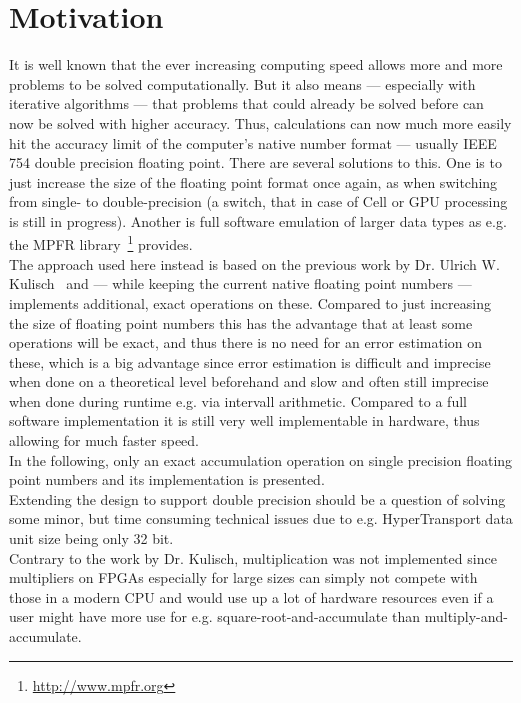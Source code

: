 
\chapter{Motivation}
It is well known that the ever increasing computing speed allows more
and more problems to be solved computationally.
But it also means --- especially with iterative algorithms --- that problems
that could already be solved before can now be solved with higher accuracy.
Thus, calculations can now much more easily hit the accuracy limit of the
computer's native number format --- usually IEEE 754 double precision floating
point.
There are several solutions to this. One is to just increase the size of the
floating point format once again, as when switching from single- to
double-precision (a switch, that in case of Cell or GPU processing is still in
progress).
Another is full software emulation of larger data types as e.g. the
MPFR library~\footnote{\url{http://www.mpfr.org}} provides.\\
The approach used here instead is based on the previous work by
Dr. Ulrich W. Kulisch~\cite{advar} and --- while keeping the current native
floating point numbers --- implements additional, exact operations on these.
Compared to just increasing the size of floating point numbers this has the
advantage that at least some operations will be exact, and thus there is no
need for an error estimation on these, which is a big advantage since error
estimation is difficult and imprecise when done on a theoretical level
beforehand and slow and often still imprecise when done during runtime e.g.
via intervall arithmetic.
Compared to a full software implementation it is still very well implementable
in hardware, thus allowing for much faster speed.\\
In the following, only an exact accumulation operation on single precision floating
point numbers and its implementation is presented.\\
Extending the design to support double precision should be a question of solving
some minor, but time consuming technical issues due to e.g. HyperTransport data
unit size being only 32 bit.\\
Contrary to the work by Dr. Kulisch, multiplication was not implemented since
multipliers on FPGAs especially for large sizes can simply not compete with
those in a modern CPU and would use up a lot of hardware resources even if
a user might have more use for e.g. square-root-and-accumulate than
multiply-and-accumulate.

